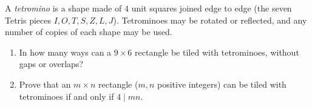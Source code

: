 A \emph{tetromino} is a shape made of $4$ unit squares joined edge to edge (the seven Tetris pieces $I,O,T,S,Z,L,J$). Tetrominoes may be rotated or reflected, and any number of copies of each shape may be used.
\begin{enumerate}
\item[(a)] In how many ways can a $9\times6$ rectangle be tiled with tetrominoes, without gaps or overlaps?
\item[(b)] Prove that an $m\times n$ rectangle ($m,n$ positive integers) can be tiled with tetrominoes if and only if $4\mid mn$.
\end{enumerate}
